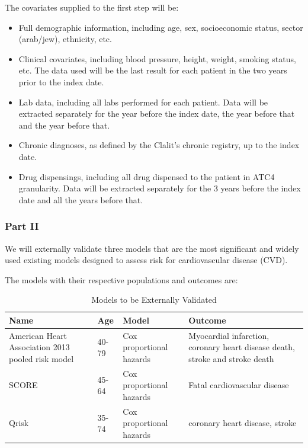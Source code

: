 \documentclass[a4paper,12pt]{article}
\begin{document}
		The covariates supplied to the first step will be: 
		\begin{itemize}
			\item Full demographic information, including age, sex, socioeconomic status, sector (arab/jew), ethnicity, etc.
			\item Clinical covariates, including blood pressure, height, weight, smoking status, etc. The data used will be the last result for each patient in the two years prior to the index date.
			\item Lab data, including all labs performed for each patient. Data will be extracted separately for the year before the index date, the year before that and the year before that.
			\item Chronic diagnoses, as defined by the Clalit's chronic registry\cite{Rennert2001}, up to the index date.
			\item Drug dispensings, including all drug dispensed to the patient in ATC4 granularity\cite{DrugStatisticsMethodology2010}. Data will be extracted separately for the 3 years before the index date and all the years before that.
		\end{itemize}
	
		\subsubsection{Part II}
		We will externally validate three models that are the most significant and widely used existing models designed to assess risk for cardiovascular disease (CVD).
		
		The models with their respective populations and outcomes are:
		\begin{table}[H]
		\begin{tabular}{|p{4cm}|p{1cm}|p{3cm}|p{4cm}|}
			\hline
			Name & Age & Model & Outcome \\
			\hline
			American Heart Association 2013 pooled risk model\cite{Goff2014} & 40-79 & Cox proportional hazards & Myocardial infarction, coronary heart disease death, stroke and stroke death \\
			\hline
			SCORE\cite{Conroy2003} & 45-64 & Cox proportional hazards & Fatal cardiovascular disease  \\
			\hline
			Qrisk\cite{Hippisley-Cox2008} & 35-74 & Cox proportional hazards & coronary heart disease, stroke \\
			\hline
		\end{tabular}
		\caption{Models to be Externally Validated}
		\end{table}
	
\end{document}
